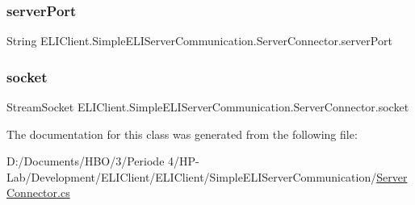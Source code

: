 \subsubsection{\texorpdfstring{server\+Port}{serverPort}}
{\footnotesize\ttfamily String E\+L\+I\+Client.\+Simple\+E\+L\+I\+Server\+Communication.\+Server\+Connector.\+server\+Port\hspace{0.3cm}{\ttfamily [private]}}

\mbox{\label{class_e_l_i_client_1_1_simple_e_l_i_server_communication_1_1_server_connector_add9c36f3ca36f096570915423fd01522}} 
\subsubsection{\texorpdfstring{socket}{socket}}
{\footnotesize\ttfamily Stream\+Socket E\+L\+I\+Client.\+Simple\+E\+L\+I\+Server\+Communication.\+Server\+Connector.\+socket\hspace{0.3cm}{\ttfamily [private]}}



The documentation for this class was generated from the following file\+:\begin{DoxyCompactItemize}
\item 
D\+:/\+Documents/\+H\+B\+O/3/\+Periode 4/\+H\+P-\/\+Lab/\+Development/\+E\+L\+I\+Client/\+E\+L\+I\+Client/\+Simple\+E\+L\+I\+Server\+Communication/\hyperlink{_server_connector_8cs}{Server\+Connector.\+cs}\end{DoxyCompactItemize}
